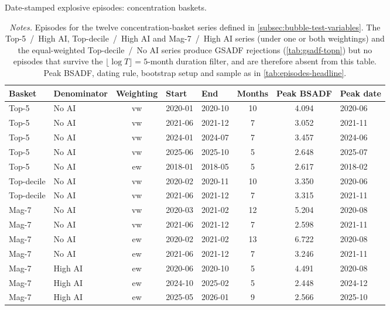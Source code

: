 \begin{table}[!htbp]
\centering
\caption{Date-stamped explosive episodes: concentration baskets.}
\label{tab:episodes-topn}
\small
\begin{tabular}{l l c l l S[table-format=2.0] S[table-format=1.3] l}
\toprule
Basket & Denominator & Weighting & Start & End & {Months} & {Peak BSADF} & Peak date \\
\midrule
Top-5      & No AI    & vw & 2020-01 & 2020-10 & 10 & 4.094 & 2020-06 \\
Top-5      & No AI    & vw & 2021-06 & 2021-12 &  7 & 3.052 & 2021-11 \\
Top-5      & No AI    & vw & 2024-01 & 2024-07 &  7 & 3.457 & 2024-06 \\
Top-5      & No AI    & vw & 2025-06 & 2025-10 &  5 & 2.648 & 2025-07 \\
Top-5      & No AI    & ew & 2018-01 & 2018-05 &  5 & 2.617 & 2018-02 \\
\midrule
Top-decile & No AI    & vw & 2020-02 & 2020-11 & 10 & 3.350 & 2020-06 \\
Top-decile & No AI    & vw & 2021-06 & 2021-12 &  7 & 3.315 & 2021-11 \\
\midrule
Mag-7      & No AI    & vw & 2020-03 & 2021-02 & 12 & 5.204 & 2020-08 \\
Mag-7      & No AI    & vw & 2021-06 & 2021-12 &  7 & 2.598 & 2021-11 \\
Mag-7      & No AI    & ew & 2020-02 & 2021-02 & 13 & 6.722 & 2020-08 \\
Mag-7      & No AI    & ew & 2021-06 & 2021-12 &  7 & 3.246 & 2021-11 \\
\midrule
Mag-7      & High AI  & ew & 2020-06 & 2020-10 &  5 & 4.491 & 2020-08 \\
Mag-7      & High AI  & ew & 2024-10 & 2025-02 &  5 & 2.448 & 2024-12 \\
Mag-7      & High AI  & ew & 2025-05 & 2026-01 &  9 & 2.566 & 2025-10 \\
\bottomrule
\end{tabular}
\caption*{\footnotesize \textit{Notes.} Episodes for the twelve concentration-basket series defined in \cref{subsec:bubble-test-variables}. The Top-5~/~High AI, Top-decile~/~High AI and Mag-7~/~High AI series (under one or both weightings) and the equal-weighted Top-decile~/~No AI series produce GSADF rejections (\cref{tab:gsadf-topn}) but no episodes that survive the $\lfloor \log T \rfloor = 5$-month duration filter, and are therefore absent from this table. Peak BSADF, dating rule, bootstrap setup and sample as in \cref{tab:episodes-headline}.}
\end{table}
 
